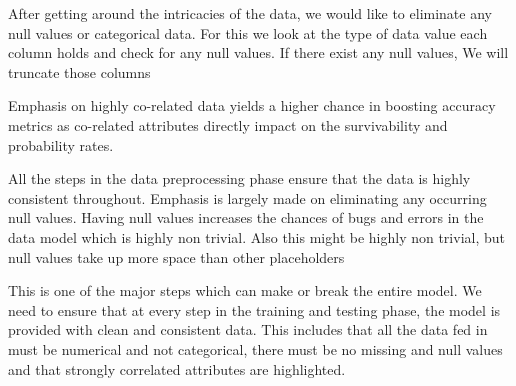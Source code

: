 \documentclass[12pt]{article}
\newcommand{\nd}{\noindent}
\begin{document}
\nd After getting around the intricacies of the data, we would like to eliminate any null values or categorical data. For this we look at the type of data value each column holds and check for any null values. If there exist any null values, We will truncate those columns

\nd Emphasis on highly co-related data yields a higher chance in boosting accuracy metrics as co-related attributes directly impact on the survivability and probability rates.

\nd All the steps in the data preprocessing phase ensure that the data is highly consistent throughout. Emphasis is largely made on eliminating any occurring null values. Having null values increases the chances of bugs and errors in the data model which is highly non trivial. Also this might be highly non trivial, but null values take up more space than other placeholders

\nd This is one of the major steps which can make or break the entire model. We need to ensure that at every step in the training and testing phase, the model is provided with clean and consistent data. This includes that all the data fed in must be numerical and not categorical, there must be no missing and null values and that strongly correlated attributes are highlighted.
\end{document}
